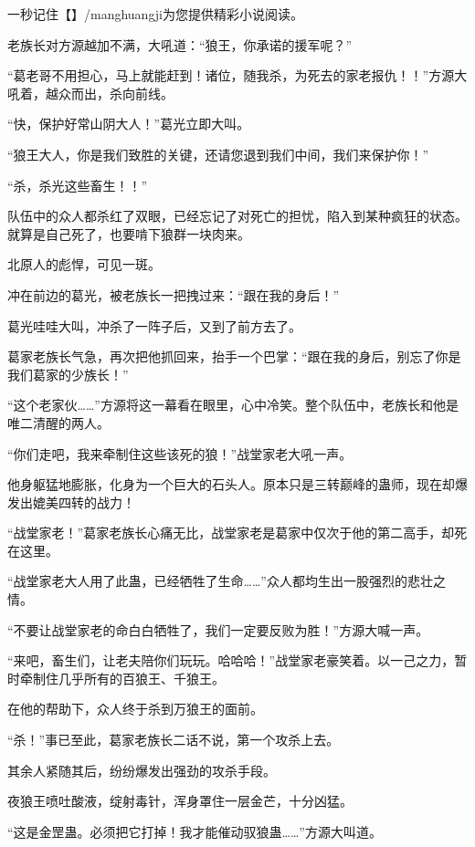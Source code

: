 
\begin{this_body}

一秒记住【】/manghuangji为您提供精彩小说阅读。

老族长对方源越加不满，大吼道：“狼王，你承诺的援军呢？”

“葛老哥不用担心，马上就能赶到！诸位，随我杀，为死去的家老报仇！！”方源大吼着，越众而出，杀向前线。

“快，保护好常山阴大人！”葛光立即大叫。

“狼王大人，你是我们致胜的关键，还请您退到我们中间，我们来保护你！”

“杀，杀光这些畜生！！”

队伍中的众人都杀红了双眼，已经忘记了对死亡的担忧，陷入到某种疯狂的状态。就算是自己死了，也要啃下狼群一块肉来。

北原人的彪悍，可见一斑。

冲在前边的葛光，被老族长一把拽过来：“跟在我的身后！”

葛光哇哇大叫，冲杀了一阵子后，又到了前方去了。

葛家老族长气急，再次把他抓回来，抬手一个巴掌：“跟在我的身后，别忘了你是我们葛家的少族长！”

“这个老家伙……”方源将这一幕看在眼里，心中冷笑。整个队伍中，老族长和他是唯二清醒的两人。

“你们走吧，我来牵制住这些该死的狼！”战堂家老大吼一声。

他身躯猛地膨胀，化身为一个巨大的石头人。原本只是三转巅峰的蛊师，现在却爆发出媲美四转的战力！

“战堂家老！”葛家老族长心痛无比，战堂家老是葛家中仅次于他的第二高手，却死在这里。

“战堂家老大人用了此蛊，已经牺牲了生命……”众人都均生出一股强烈的悲壮之情。

“不要让战堂家老的命白白牺牲了，我们一定要反败为胜！”方源大喊一声。

“来吧，畜生们，让老夫陪你们玩玩。哈哈哈！”战堂家老豪笑着。以一己之力，暂时牵制住几乎所有的百狼王、千狼王。

在他的帮助下，众人终于杀到万狼王的面前。

“杀！”事已至此，葛家老族长二话不说，第一个攻杀上去。

其余人紧随其后，纷纷爆发出强劲的攻杀手段。

夜狼王喷吐酸液，绽射毒针，浑身罩住一层金芒，十分凶猛。

“这是金罡蛊。必须把它打掉！我才能催动驭狼蛊……”方源大叫道。


\end{this_body}
